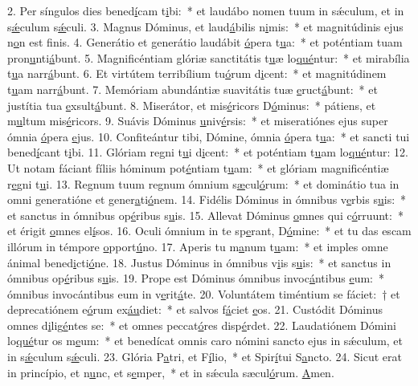 2. Per síngulos dies bened\uline{í}cam t\uline{i}bi:~* et laudábo nomen tuum in sǽculum, et in s\uline{ǽ}culum s\uline{ǽ}culi.
3. Magnus Dóminus, et laud\uline{á}bilis n\uline{i}mis:~* et magnitúdinis ejus n\uline{o}n est f\uline{i}nis.
4. Generátio et generátio laudábit \uline{ó}pera t\uline{u}a:~* et poténtiam tuam pron\uline{u}nti\uline{á}bunt.
5. Magnificéntiam glóriæ sanctitátis t\uline{u}æ lo\uline{qué}ntur:~* et mirabília t\uline{u}a narr\uline{á}bunt.
6. Et virtútem terribílium tu\uline{ó}rum d\uline{i}cent:~* et magnitúdinem t\uline{u}am narr\uline{á}bunt.
7. Memóriam abundántiæ suavitátis tuæ \uline{e}ruct\uline{á}bunt:~* et justítia tua \uline{e}xsult\uline{á}bunt.
8. Miserátor, et mis\uline{é}ricors D\uline{ó}minus:~* pátiens, et m\uline{u}ltum mis\uline{é}ricors.
9. Suávis Dóminus \uline{u}niv\uline{é}rsis:~* et miseratiónes ejus super ómnia \uline{ó}pera \uline{e}jus.
10. Confiteántur tibi, Dómine, ómnia \uline{ó}pera t\uline{u}a:~* et sancti tui bened\uline{í}cant t\uline{i}bi.
11. Glóriam regni t\uline{u}i d\uline{i}cent:~* et poténtiam t\uline{u}am lo\uline{qué}ntur:
12. Ut notam fáciant fíliis hóminum pot\uline{é}ntiam t\uline{u}am:~* et glóriam magnificéntiæ r\uline{e}gni t\uline{u}i.
13. Regnum tuum regnum ómnium s\uline{æ}cul\uline{ó}rum:~* et dominátio tua in omni generatióne et gener\uline{a}ti\uline{ó}nem.
14. Fidélis Dóminus in ómnibus v\uline{e}rbis s\uline{u}is:~* et sanctus in ómnibus op\uline{é}ribus s\uline{u}is.
15. Allevat Dóminus \uline{o}mnes qui c\uline{ó}rruunt:~* et érigit \uline{o}mnes el\uline{í}sos.
16. Oculi ómnium in te sp\uline{e}rant, D\uline{ó}mine:~* et tu das escam illórum in témpore \uline{o}pport\uline{ú}no.
17. Aperis tu m\uline{a}num t\uline{u}am:~* et imples omne ánimal bened\uline{i}cti\uline{ó}ne.
18. Justus Dóminus in ómnibus v\uline{i}is s\uline{u}is:~* et sanctus in ómnibus op\uline{é}ribus s\uline{u}is.
19. Prope est Dóminus ómnibus invoc\uline{á}ntibus \uline{e}um:~* ómnibus invocántibus eum in v\uline{e}rit\uline{á}te.
20. Voluntátem timéntium se fáciet:~† et deprecatiónem e\uline{ó}rum ex\uline{áu}diet:~* et salvos f\uline{á}ciet \uline{e}os.
21. Custódit Dóminus omnes d\uline{i}lig\uline{é}ntes se:~* et omnes peccat\uline{ó}res disp\uline{é}rdet.
22. Laudatiónem Dómini lo\uline{qué}tur os m\uline{e}um:~* et benedícat omnis caro nómini sancto ejus in sǽculum, et in s\uline{ǽ}culum s\uline{ǽ}culi.
23. Glória P\uline{a}tri, et F\uline{í}lio,~* et Spir\uline{í}tui S\uline{a}ncto.
24. Sicut erat in princípio, et n\uline{u}nc, et s\uline{e}mper,~* et in sǽcula sæcul\uline{ó}rum. \uline{A}men.
